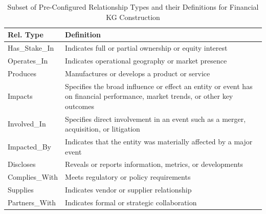 
\begin{table}[htbp]
\small
\centering
\renewcommand{\arraystretch}{1.2}
\caption{Subset of Pre-Configured Relationship Types and their Definitions for Financial KG Construction}
\label{tab:relationships}
\begin{tabularx}{\columnwidth}{|l|X|}
\hline
\textbf{Rel. Type} & \textbf{Definition} \\
\hline
Has\_Stake\_In & Indicates full or partial ownership or equity interest \\
\hline
Operates\_In & Indicates operational geography or market presence \\
\hline
Produces & Manufactures or develops a product or service \\
\hline
Impacts & Specifies the broad influence or effect an entity or event has on financial performance, market trends, or other key outcomes \\
\hline
Involved\_In & Specifies direct involvement in an event such as a merger, acquisition, or litigation \\
\hline
Impacted\_By & Indicates that the entity was materially affected by a major event \\
\hline
Discloses & Reveals or reports information, metrics, or developments \\
\hline
Complies\_With & Meets regulatory or policy requirements \\
\hline
Supplies & Indicates vendor or supplier relationship \\
\hline
Partners\_With & Indicates formal or strategic collaboration \\
\hline
\end{tabularx}
\end{table}